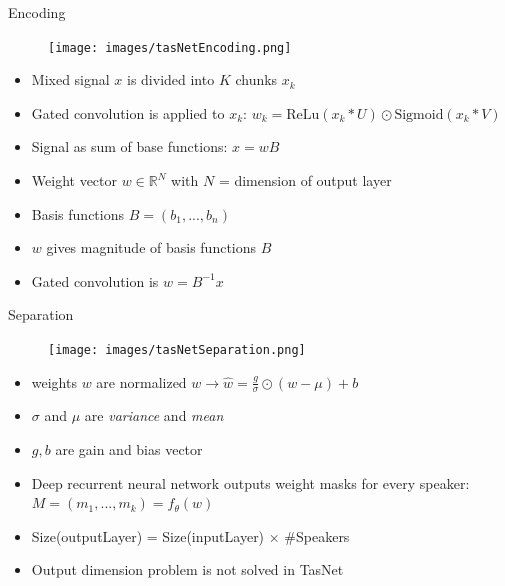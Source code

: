 \documentclass[xcolor=table,mathserif,9pt]{beamer}    %
\begin{document}
\begin{frame}{Encoding}

\begin{minipage}[t]{0.48\linewidth}
	\begin{figure}[htpb]
		\centering
		\texttt{[image: images/tasNetEncoding.png]}
	\end{figure}
\end{minipage}%
\hfill%
\begin{minipage}[t]{0.48\linewidth}
	\begin{itemize}
		\item Mixed signal $x$ is divided into $K$ chunks $x_k$ 
		\item Gated convolution is applied to $x_k$: 
		\emph{$w_k = \text{ReLu}(x_k * U) \odot \text{Sigmoid}(x_k * V)$}
	\end{itemize}
	\vspace{5mm}
	\begin{itemize}
		\item Signal as sum of base functions: $x = wB$
		\item Weight vector $w \in \mathbb{R}^{N}$ with $N$ = 
		      dimension of output layer
		\item Basis functions $B = (b_1, ...,b_n)$ 
		\item $w$ gives magnitude of basis functions $B$
		\item Gated convolution is \emph{$w = B^{-1}x$}
	\end{itemize}
\end{minipage}	



\end{frame}

\begin{frame}{Separation}

\begin{minipage}[t]{0.48\linewidth}
	\begin{figure}[htpb]
		\centering
		\texttt{[image: images/tasNetSeparation.png]}
	\end{figure}
\end{minipage}%
\hfill%
\begin{minipage}[t]{0.48\linewidth}
	\hfill
	\begin{itemize}
		\item weights $w$ are normalized $w \to \hat{w} = \frac{g}{\sigma} \odot (w - \mu) + b$ 
		\item $\sigma$ and $\mu$ are \emph{variance} and \emph{mean}
		\item $g,b$ are gain and bias vector
		\item Deep recurrent neural network outputs weight masks for every
			speaker: $M = (m_1, ...,m_k)  = f_{\theta}(w)$
		\item Size(outputLayer) = Size(inputLayer) $\times$ $\#$Speakers
		\item Output dimension problem is not solved in TasNet
	\end{itemize}
\end{minipage}	

\end{frame}
\end{document}
